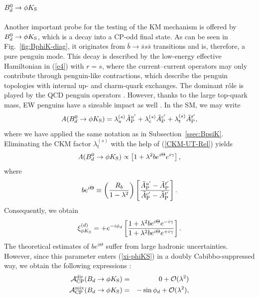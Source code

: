 \documentclass[11pt]{cernrep}
\begin{document}
\subsection{$B^0_d\to \phi K_{\rm S}$}\label{ssec:BphiK}
\unboldmath
%
%
%
Another important probe for the testing of the KM mechanism is 
offered by $B_d^0\to \phi K_{\rm S}$, which is a 
decay into a CP-odd final state. As can be seen in Fig.~\ref{fig:BphiK-diag},
it originates from $\bar b\to \bar s s \bar s$ transitions and is, therefore, a 
pure penguin mode. This decay is described by the low-energy effective 
Hamiltonian in (\ref{e4}) with $r=s$, where the current--current operators 
may only contribute through penguin-like contractions, which describe the
penguin topologies with internal up- and charm-quark exchanges. The dominant
r\^ole is played by the QCD penguin operators \cite{BphiK-old}. However,
thanks to the large top-quark mass, EW penguins have a sizeable impact as 
well \cite{RF-EWP,DH-PhiK}. In the SM, we may write
\begin{equation}\label{B0phiK0-ampl}
A(B_d^0\to \phi K_{\rm S})=\lambda_u^{(s)}\tilde A_{\rm P}^{u'}
+\lambda_c^{(s)}\tilde A_{\rm P}^{c'}+\lambda_t^{(s)}\tilde A_{\rm P}^{t'},
\end{equation}
where we have applied the same notation as in Subsection~\ref{ssec:BpsiK}.
Eliminating the CKM factor $\lambda_t^{(s)}$ with the help of
(\ref{CKM-UT-Rel}) yields
\begin{equation}
A(B_d^0\to \phi K_{\rm S})\propto
\left[1+\lambda^2 b e^{i\Theta}e^{i\gamma}\right],
\end{equation}
where 
\begin{equation}
b e^{i\Theta}\equiv\left(\frac{R_b}{1-\lambda^2}\right)\left[
\frac{\tilde A_{\rm P}^{u'}-\tilde A_{\rm P}^{t'}}{\tilde A_{\rm P}^{c'}-
\tilde A_{\rm P}^{t'}}\right].
\end{equation}
Consequently,  we obtain
\begin{equation}\label{xi-phiKS}
\xi_{\phi K_{\rm S}}^{(d)}=+e^{-i\phi_d}
\left[\frac{1+\lambda^2b e^{i\Theta}e^{-i\gamma}}{1+
\lambda^2b e^{i\Theta}e^{+i\gamma}}\right].
\end{equation}
The theoretical estimates of $b e^{i\Theta}$ 
suffer from large hadronic uncertainties. However, since this parameter enters 
(\ref{xi-phiKS}) in a doubly Cabibbo-suppressed way, we obtain the 
following expressions \cite{RF-EWP-rev}:
\begin{eqnarray}
{\cal A}_{\rm CP}^{\rm dir}(B_d\to \phi K_{\rm S})&=&0+
{\cal O}(\lambda^2)\label{BphiK-rel1}\\
{\cal A}_{\rm CP}^{\rm mix}(B_d\to \phi K_{\rm S})&=&-\sin\phi_d
+{\cal O}(\lambda^2),\label{BphiK-rel2}
\end{eqnarray}
\end{document}
